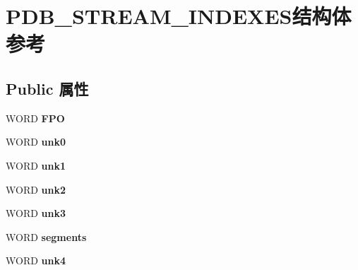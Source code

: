 \hypertarget{struct_p_d_b___s_t_r_e_a_m___i_n_d_e_x_e_s}{}\section{P\+D\+B\+\_\+\+S\+T\+R\+E\+A\+M\+\_\+\+I\+N\+D\+E\+X\+E\+S结构体 参考}
\label{struct_p_d_b___s_t_r_e_a_m___i_n_d_e_x_e_s}
\subsection*{Public 属性}
\begin{DoxyCompactItemize}
\item 
\mbox{\label{struct_p_d_b___s_t_r_e_a_m___i_n_d_e_x_e_s_adea856205eb0512372250f651a19515e}} 
W\+O\+RD {\bfseries F\+PO}
\item 
\mbox{\label{struct_p_d_b___s_t_r_e_a_m___i_n_d_e_x_e_s_a3d2584070e3bb65f7c5df1dd83826a60}} 
W\+O\+RD {\bfseries unk0}
\item 
\mbox{\label{struct_p_d_b___s_t_r_e_a_m___i_n_d_e_x_e_s_a259d75baa20a074f15b821b1998e8c02}} 
W\+O\+RD {\bfseries unk1}
\item 
\mbox{\label{struct_p_d_b___s_t_r_e_a_m___i_n_d_e_x_e_s_abd6b3a06a79b327417afd975f2309d19}} 
W\+O\+RD {\bfseries unk2}
\item 
\mbox{\label{struct_p_d_b___s_t_r_e_a_m___i_n_d_e_x_e_s_ad9c2d929b41676374bb1c767c9b1963b}} 
W\+O\+RD {\bfseries unk3}
\item 
\mbox{\label{struct_p_d_b___s_t_r_e_a_m___i_n_d_e_x_e_s_af0c21c839436ec0aca11d6ff8d4ae7ff}} 
W\+O\+RD {\bfseries segments}
\item 
\mbox{\label{struct_p_d_b___s_t_r_e_a_m___i_n_d_e_x_e_s_a95578f7f39cdb3ad54af3710db825bec}} 
W\+O\+RD {\bfseries unk4}
\item 
\mbox{\label{struct_p_d_b___s_t_r_e_a_m___i_n_d_e_x_e_s_a1c5d7b5e86385941eef19c2bba85c5df}} 

\end{DoxyCompactItemize}
